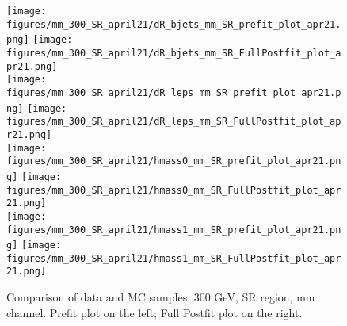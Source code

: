 \begin{figure}[H]
\begin{center}
\texttt{[image: figures/mm\_300\_SR\_april21/dR\_bjets\_mm\_SR\_prefit\_plot\_apr21.png]}
\texttt{[image: figures/mm\_300\_SR\_april21/dR\_bjets\_mm\_SR\_FullPostfit\_plot\_apr21.png]}\\
\texttt{[image: figures/mm\_300\_SR\_april21/dR\_leps\_mm\_SR\_prefit\_plot\_apr21.png]}
\texttt{[image: figures/mm\_300\_SR\_april21/dR\_leps\_mm\_SR\_FullPostfit\_plot\_apr21.png]}\\
\texttt{[image: figures/mm\_300\_SR\_april21/hmass0\_mm\_SR\_prefit\_plot\_apr21.png]}
\texttt{[image: figures/mm\_300\_SR\_april21/hmass0\_mm\_SR\_FullPostfit\_plot\_apr21.png]}\\
\texttt{[image: figures/mm\_300\_SR\_april21/hmass1\_mm\_SR\_prefit\_plot\_apr21.png]}
\texttt{[image: figures/mm\_300\_SR\_april21/hmass1\_mm\_SR\_FullPostfit\_plot\_apr21.png]}\\
\caption[Data-MC comparison in SR.]{Comparison of data and MC samples. 300 GeV, SR region, mm channel. Prefit plot on the left; Full Postfit plot on the right.}
\label{MCcomparisons_mm_low_SR}
\end{center}
\end{figure}

